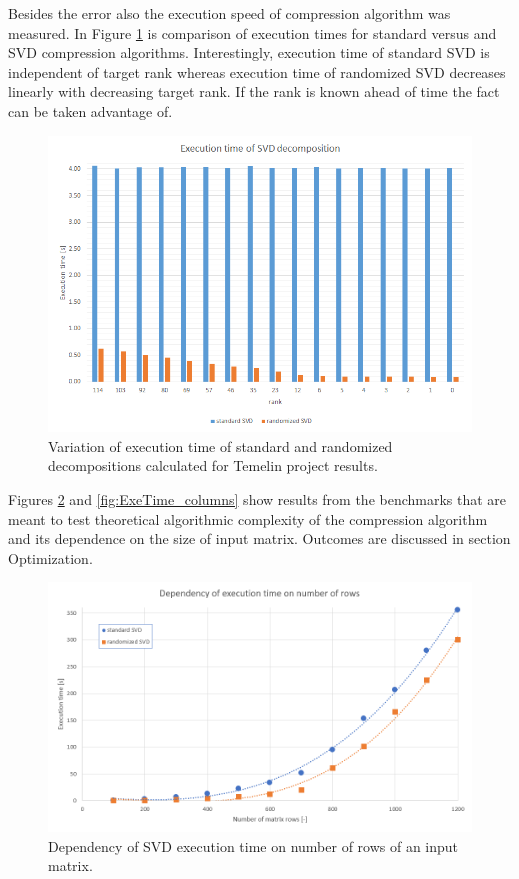 Besides the error also the execution speed of compression algorithm was measured. In Figure \ref{fig:temelin:ExeTime} is comparison of execution times for standard versus and SVD compression algorithms. Interestingly, execution time of standard SVD is independent of target rank whereas execution time of randomized SVD decreases linearly with decreasing target rank. If the rank is known ahead of time the fact can be taken advantage of.

\begin{figure}[H]
\centering\includegraphics[width=\textwidth]{figures/temelin_ExecutionTime}
\caption{Variation of execution time of standard and randomized decompositions calculated for Temelin project results.}
\label{fig:temelin:ExeTime}
\end{figure}

Figures \ref{fig:ExeTime_rows} and \ref{fig:ExeTime_columns} show results from the benchmarks that are meant to test theoretical algorithmic complexity of the compression algorithm and its dependence on the size of input matrix. Outcomes are discussed in section Optimization.

\begin{figure}[H]
\centering\includegraphics[width=\textwidth]{figures/executionTime_varyingRows}
\caption{Dependency of SVD execution time on number of rows of an input matrix.}
\label{fig:ExeTime_rows}
\end{figure}

